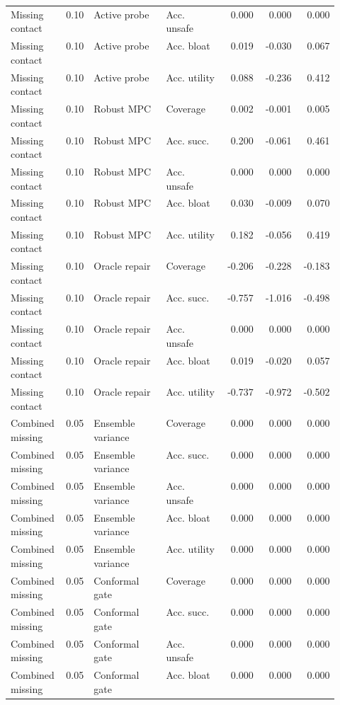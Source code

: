\documentclass{article}
\begin{document}
\begin{center}
\begin{longtable}{p{0.14\linewidth}rp{0.22\linewidth}p{0.18\linewidth}rrr}
Missing contact & 0.10 & Active probe & Acc. unsafe & 0.000 & 0.000 & 0.000\\
Missing contact & 0.10 & Active probe & Acc. bloat & 0.019 & -0.030 & 0.067\\
Missing contact & 0.10 & Active probe & Acc. utility & 0.088 & -0.236 & 0.412\\
Missing contact & 0.10 & Robust MPC & Coverage & 0.002 & -0.001 & 0.005\\
Missing contact & 0.10 & Robust MPC & Acc. succ. & 0.200 & -0.061 & 0.461\\
Missing contact & 0.10 & Robust MPC & Acc. unsafe & 0.000 & 0.000 & 0.000\\
Missing contact & 0.10 & Robust MPC & Acc. bloat & 0.030 & -0.009 & 0.070\\
Missing contact & 0.10 & Robust MPC & Acc. utility & 0.182 & -0.056 & 0.419\\
Missing contact & 0.10 & Oracle repair & Coverage & -0.206 & -0.228 & -0.183\\
Missing contact & 0.10 & Oracle repair & Acc. succ. & -0.757 & -1.016 & -0.498\\
Missing contact & 0.10 & Oracle repair & Acc. unsafe & 0.000 & 0.000 & 0.000\\
Missing contact & 0.10 & Oracle repair & Acc. bloat & 0.019 & -0.020 & 0.057\\
Missing contact & 0.10 & Oracle repair & Acc. utility & -0.737 & -0.972 & -0.502\\
Combined missing & 0.05 & Ensemble variance & Coverage & 0.000 & 0.000 & 0.000\\
Combined missing & 0.05 & Ensemble variance & Acc. succ. & 0.000 & 0.000 & 0.000\\
Combined missing & 0.05 & Ensemble variance & Acc. unsafe & 0.000 & 0.000 & 0.000\\
Combined missing & 0.05 & Ensemble variance & Acc. bloat & 0.000 & 0.000 & 0.000\\
Combined missing & 0.05 & Ensemble variance & Acc. utility & 0.000 & 0.000 & 0.000\\
Combined missing & 0.05 & Conformal gate & Coverage & 0.000 & 0.000 & 0.000\\
Combined missing & 0.05 & Conformal gate & Acc. succ. & 0.000 & 0.000 & 0.000\\
Combined missing & 0.05 & Conformal gate & Acc. unsafe & 0.000 & 0.000 & 0.000\\
Combined missing & 0.05 & Conformal gate & Acc. bloat & 0.000 & 0.000 & 0.000\\

\end{longtable}
\end{center}
\end{document}
